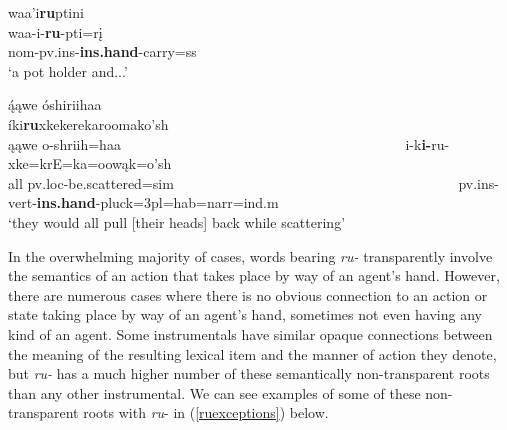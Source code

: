 \begin{exe}
\begin{xlist}
	\item \glll waa'i\textbf{ru}ptini\\
	waa-i-\textbf{ru}-pti=rį\\
	nom-pv.ins-\textbf{ins.hand}-\textnormal{carry}=ss\\
	\glt `a pot holder and...' \citep[149]{hollow1973a}
	
	\item \glll ą́ąwe óshiriihaa ~ ~ ~ ~ ~ ~ ~ ~ ~ ~ ~ ~ ~ ~ ~ ~ ~ ~ ~ ~ ~ ~ ~ ~ íki\textbf{ru}xkekerekaroomako'sh\\
	ąąwe o-shriih=haa ~ ~ ~ ~ ~ ~ ~ ~ ~ ~ ~ ~ ~ ~ ~ ~ ~ ~ ~ ~ ~ ~ ~ ~ i-k\textbf{i-}ru-xke=krE=ka=oowąk=o'sh\\
	\textnormal{all} pv.loc-\textnormal{be.scattered}=sim ~ ~ ~ ~ ~ ~ ~ ~ ~ ~ ~ ~ ~ ~ ~ ~ ~ ~ ~ ~ ~ ~ ~ ~ pv.ins-vert-\textbf{ins.hand}-\textnormal{pluck}=3pl=hab=narr=ind.m\\
	\glt `they would all pull [their heads] back while scattering' \citep[45]{hollow1973a}
	
	\end{xlist}

\end{exe}

In the overwhelming majority of cases, words bearing \textit{ru-} transparently involve the semantics of an action that takes place by way of an agent's hand. However, there are numerous cases where there is no obvious connection to an action or state taking place by way of an agent's hand, sometimes not even having any kind of an agent. Some instrumentals have similar opaque connections between the meaning of the resulting lexical item and the manner of action they denote, but \textit{ru-} has a much higher number of these semantically non-transparent roots than any other instrumental. We can see examples of some of these non-transparent roots with \textit{ru}- in (\ref{ruexceptions}) below.

